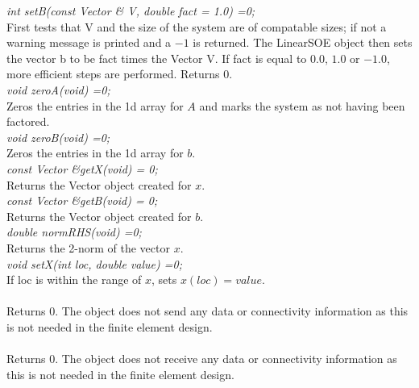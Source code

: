 {\em int setB(const Vector \& V, double fact = 1.0) =0;} \\
First tests that \p V and the size of the system are of compatable
sizes; if not a warning message is printed and a $-1$ is returned. The
LinearSOE object then sets the vector \p b to be \p fact times
the Vector \p V. If \p fact is equal to $0.0$, $1.0$ or $-1.0$,
more efficient steps are performed. Returns $0$. \\ 

{\em void zeroA(void) =0;} \\
Zeros the entries in the 1d array for $A$ and marks the system as not
having been factored. \\

{\em void zeroB(void) =0;} \\
Zeros the entries in the 1d array for $b$. \\

{\em const Vector \&getX(void) = 0;} \\
Returns the Vector object created for $x$. \\

{\em const Vector \&getB(void) = 0;} \\
Returns the Vector object created for $b$. \\

{\em double normRHS(void) =0;} \\
Returns the 2-norm of the vector $x$. \\

{\em void setX(int loc, double value) =0;}\\
If \p loc is within the range of $x$, sets $x(loc) = value$. \\

\\ 
Returns $0$. The object does not send any data or connectivity
information as this is not needed in the finite element design. \\

\\ 
Returns $0$. The object does not receive any data or connectivity
information as this is not needed in the finite element design.




